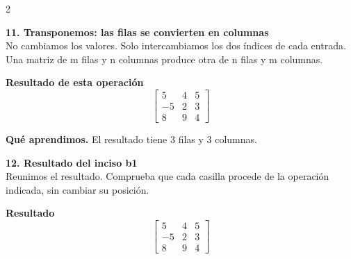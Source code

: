 \documentclass[11pt,a4paper,landscape]{article}
\begin{document}
\begin{multicols*}{2}
\noindent\begin{minipage}{\linewidth}\textbf{11. Transponemos: las filas se convierten en columnas}\\[2pt]No cambiamos los valores. Solo intercambiamos los dos índices de cada entrada. Una matriz de m filas y n columnas produce otra de n filas y m columnas.
\par{}\par\smallskip
\par\smallskip \textbf{Resultado de esta operación}\[\begin{bmatrix}5 & 4 & 5\\-5 & 2 & 3\\8 & 9 & 4\end{bmatrix}\]
\par\smallskip\textbf{Qué aprendimos.} El resultado tiene 3 filas y 3 columnas.
\end{minipage}\par\medskip
\noindent\begin{minipage}{\linewidth}\textbf{12. Resultado del inciso b1}\\[2pt]Reunimos el resultado. Comprueba que cada casilla procede de la operación indicada, sin cambiar su posición.
\par\smallskip \textbf{Resultado}\[\begin{bmatrix}5 & 4 & 5\\-5 & 2 & 3\\8 & 9 & 4\end{bmatrix}\]
\end{minipage}\par\medskip

\end{multicols*}
\end{document}

